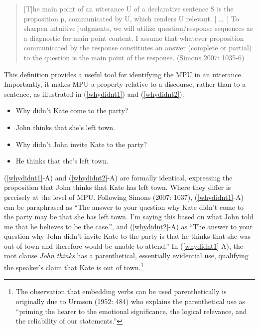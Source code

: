 \documentclass[output=paper]{LSP/langsci}
\begin{document}
\begin{quote}
	[T]he main point of an utterance U of a declarative sentence S is the proposition p, communicated by U, which renders U relevant. [ \ldots\ ] To sharpen intuitive judgments, we will utilize question/response sequences as a diagnostic for main point content. I assume that whatever proposition communicated by the response constitutes an answer (complete or partial) to the question is the main point of the response. (Simons 2007: 1035-6)
\end{quote}

This definition provides a useful tool for identifying the MPU in an utterance. Importantly, it makes MPU a property relative to a discourse, rather than to a sentence, as illustrated in (\ref{whydidnt1}) and (\ref{whydidnt2}):
\begin{exe}
	\ex \begin{itemize}
		\item[Q.] Why didn't Kate come to the party?
		\item[A.] John thinks that she's left town.
	\end{itemize}  \label{whydidnt1}
	\ex \label{whydidnt2}\begin{itemize}
		\item[Q.] Why didn't John invite Kate to the party?
		\item[A.] He thinks that she's left town.
	\end{itemize}
\end{exe}

(\ref{whydidnt1}-A) and (\ref{whydidnt2}-A) are formally identical, expressing the proposition that John thinks that Kate has left town. Where they differ is precisely at the level of MPU. Following Simons (2007: 1037), (\ref{whydidnt1}-A) can be paraphrased as ``The answer to your question why Kate didn't come to the party may be that she has left town. I'm saying this based on what John told me that he believes to be the case.'', and (\ref{whydidnt2}-A) as ``The answer to your question why John didn't invite Kate to the party is that he thinks that she was out of town and therefore would be unable to attend.'' In (\ref{whydidnt1}-A), the root clause \textit{John thinks} has a parenthetical, essentially evidential use, qualifying the speaker's claim that Kate is out of town.\footnote{The observation that embedding verbs can be used parenthetically is originally due to Urmson (1952: 484) who explains the parenthetical use as ``priming the hearer to the emotional significance, the logical relevance, and the reliability of our statements.''} 
\end{document}
